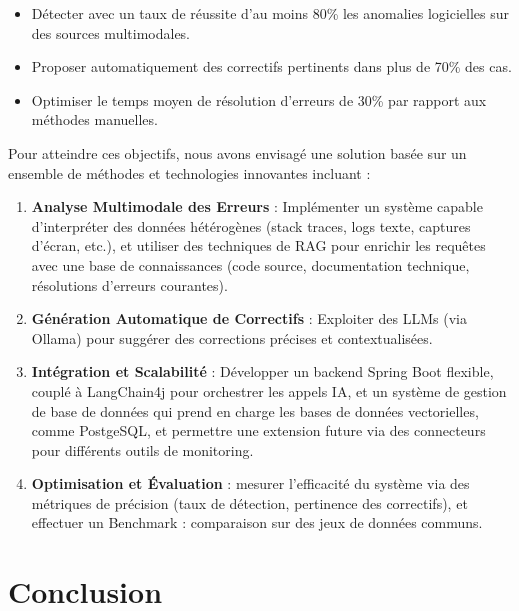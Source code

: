 \documentclass[12pt,a4paper]{report}
\begin{document}
	\renewcommand{\labelitemi}{$\bullet$}
	\begin{itemize}
		\item Détecter avec un taux de réussite d'au moins 80\% les anomalies logicielles sur des sources multimodales.
		
		\item Proposer automatiquement des correctifs pertinents dans plus de 70\% des cas.
		
		\item Optimiser le temps moyen de résolution d’erreurs de 30\% par rapport aux méthodes manuelles.
	\end{itemize}
	
	Pour atteindre ces objectifs, nous avons envisagé une solution basée sur un ensemble de méthodes et technologies innovantes incluant :
	
	\begin{enumerate}
		\item \textbf{Analyse Multimodale des Erreurs} : Implémenter un système capable d’interpréter des données hétérogènes (stack traces, logs texte, captures d’écran, etc.), et utiliser des techniques de RAG pour enrichir les requêtes avec une base de connaissances (code source, documentation technique, résolutions d’erreurs courantes).
		
		\item \textbf{Génération Automatique de Correctifs} : Exploiter des LLMs (via Ollama) pour suggérer des corrections précises et contextualisées.
		
		\item \textbf{Intégration et Scalabilité} : Développer un backend Spring Boot flexible, couplé à LangChain4j pour orchestrer les appels IA, et un système de gestion de base de données qui prend en charge les bases de données vectorielles, comme PostgeSQL, et permettre une extension future via des connecteurs pour différents outils de monitoring.
		
		\item \textbf{Optimisation et Évaluation} : mesurer l’efficacité du système via des métriques de précision (taux de détection, pertinence des correctifs), et effectuer un Benchmark : comparaison sur des jeux de données communs.
		
	\end{enumerate}
	
	\section{Conclusion}
	
\end{document}
